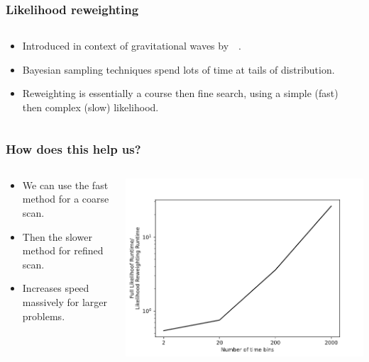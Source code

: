 \documentclass{beamer}
\begin{document}
      \begin{frame}
          \frametitle{Likelihood reweighting}

        \begin{columns}
        \begin{column}{0.5\textwidth}
        \begin{itemize}
          \item Introduced in context of gravitational waves by~\cite{payne2019higher}~\cite{romero2019searching}.
          \item Bayesian sampling techniques spend lots of time at tails of distribution.
          \item Reweighting is essentially a course then fine search, using a simple (fast) then complex (slow) likelihood.
        \end{itemize}
      \end{column}
      \begin{column}{0.5\textwidth}
      \end{column}
        \end{columns}
      \end{frame}

      \begin{frame}
        \frametitle{How does this help us?}
        \begin{columns}
        \begin{column}{0.5\textwidth}
          \begin{itemize}
            \item We can use the fast method for a coarse scan.
            \item Then the slower method for refined scan.
            \item Increases speed massively for larger problems.
        \end{itemize}
      \end{column}
      \begin{column}{0.5\textwidth}
        \includegraphics[width=1\textwidth]{lrw_runtime.png}
      \end{column}
    \end{columns}
    \end{frame}
\end{document}
